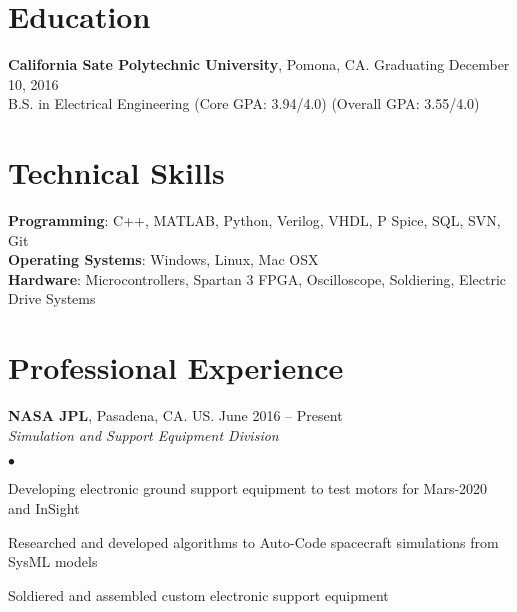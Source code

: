 \documentclass[margin,line]{res}
\newenvironment{list2}{
  \begin{list}{$\bullet$}{%
      \setlength{\itemsep}{0in}
      \setlength{\parsep}{0in} \setlength{\parskip}{0in}
      \setlength{\topsep}{0in} \setlength{\partopsep}{0in}
      \setlength{\leftmargin}{0.2in}}}{\end{list}}
\begin{document}

\begin{resume}


\section{\sc Education}
{\bf California Sate Polytechnic University}, Pomona, CA.  \hfill Graduating December 10, 2016\\
B.S. in Electrical Engineering \hfill(Core GPA: 3.94/4.0) (Overall GPA: 3.55/4.0)

\section{\sc Technical Skills}
{\bf Programming}:  C++, MATLAB, Python, Verilog, VHDL, P Spice, SQL, SVN, Git\\
{\bf Operating Systems}: Windows, Linux, Mac OSX\\
{\bf Hardware}: Microcontrollers, Spartan 3 FPGA, Oscilloscope, Soldiering, Electric Drive Systems


\section{\sc Professional Experience}
{\bf NASA JPL}, Pasadena, CA. US. \hfill{June 2016 -- Present}\\
{\em Simulation and Support Equipment Division}\hfill 
\begin{list2} %
\item Developing electronic ground support equipment to test motors for Mars-2020 and InSight 
\item Researched and developed algorithms to Auto-Code spacecraft simulations from SysML models
\item Soldiered and assembled custom electronic support equipment 
\end{list2}



\end{resume}
\end{document}
